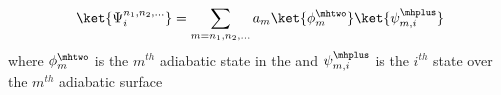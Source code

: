 %
%

\begin{equation}
    \ket{\Psi_{i}^{n_1, n_2, ...}} = \sum_{m=n_1, n_2, ...} a_m \ket{\phi^{\mhtwo}_{m}}\ket{\psi^{\mhplus}_{m, i}}
\label{eq:adiabatic_wfns}
\end{equation}
where $\phi^{\mhtwo}_{m} $ is the $m^{th}$ adiabatic state in the \htwos{} and $\psi^{\mhplus}_{m, i}$ is the $i^{th}$ \hplus{} state over the $m^{th}$ adiabatic surface

%
